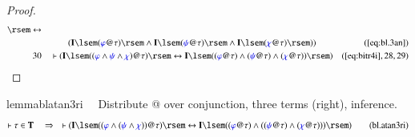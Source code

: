 \begin{proof}
\begin{align}
      \rsem \leftrightarrow  \notag \\ & & & \qquad
      ( \mathbf{I} \lsem (
      \mw{\varphi} @ \tau ) \rsem \wedge \mathbf{I} \lsem (
      \mw{\psi} @ \tau ) \rsem \wedge \mathbf{I} \lsem (
      \mw{\chi} @ \tau ) \rsem )
      )&(\mbox{\ref{eq:bl.3an}})\notag
  \\ 30 &&  & \vdash ( \mathbf{I} \lsem ( ( \mw{\varphi} \wedge \mw{\psi}
      \wedge \mw{\chi} ) @ \tau ) \rsem \leftrightarrow
      \mathbf{I} \lsem ( ( \mw{\varphi} @ \tau ) \wedge (
      \mw{\psi} @ \tau ) \wedge ( \mw{\chi} @ \tau ) )
      \rsem )&(\mbox{\ref{eq:bitr4i}},28,29)\notag
\end{align}
\end{proof}

\begin{restatable}{lemma}{blatan3ri}~~ Distribute @ over conjunction, three
terms (right), inference.
\begin{align}
\vdash \tau \in \mathbf{T}\quad\Rightarrow\quad \vdash ( \mathbf{I} \lsem ( (
    \mw{\varphi} \wedge ( \mw{\psi} \wedge \mw{\chi} ) ) @ \tau ) \rsem
    \leftrightarrow \mathbf{I} \lsem ( ( \mw{\varphi} @ \tau ) \wedge ( (
    \mw{\psi} @ \tau ) \wedge ( \mw{\chi} @ \tau ) ) ) \rsem
    )\label{eq:bl.atan3ri}\tag{bl.atan3ri}
\end{align}
\end{restatable}

